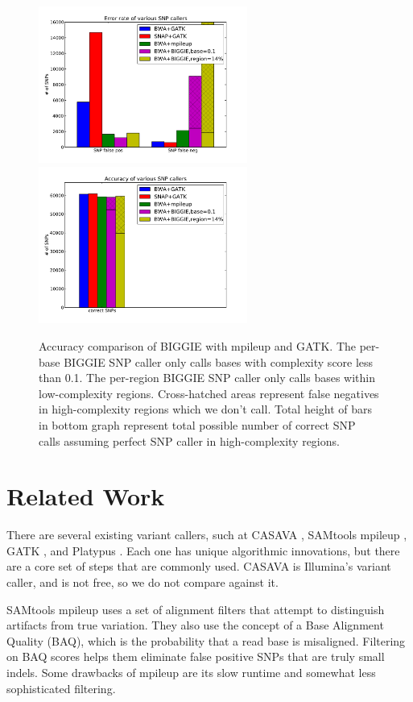 \documentclass[10pt]{article}
\begin{document}
\begin{figure}[t!]
	\includegraphics[width=2.7in]{figs/variant_call_results_all.pdf} \hspace{5mm}
	\includegraphics[width=2.7in]{figs/correct_results_all.pdf}
	\caption{Accuracy comparison of BIGGIE with mpileup and GATK.
  The per-base BIGGIE SNP caller only calls bases with complexity score less than 0.1.
  The per-region BIGGIE SNP caller only calls bases within low-complexity regions.
  Cross-hatched areas represent false negatives in high-complexity regions which we don't call.
  Total height of bars in bottom graph represent total possible number of correct SNP calls assuming perfect SNP caller in high-complexity regions.}
  \label{fig:error}
\end{figure}


\section{Related Work}
\label{sec:relatedWork}

There are several existing variant callers, such at CASAVA \cite{casava}, SAMtools mpileup \cite{samtools}, GATK \cite{gatk}, and Platypus \cite{platypus}. Each one has unique algorithmic innovations, but there are a core set of steps that are commonly used. CASAVA is Illumina's variant caller, and is not free, so we do not compare against it.

SAMtools mpileup uses a set of alignment filters that attempt to distinguish artifacts from true variation. They also use the concept of a Base Alignment Quality (BAQ), which is the probability that a read base is misaligned. Filtering on BAQ scores helps them eliminate false positive SNPs that are truly small indels. Some drawbacks of mpileup are its slow runtime and somewhat less sophisticated filtering.
\end{document}

